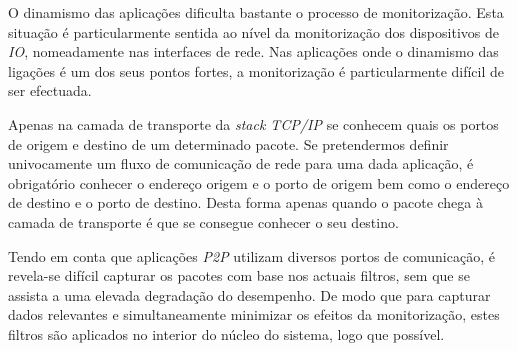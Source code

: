 O dinamismo das aplicações dificulta bastante o processo de monitorização.
Esta situação é particularmente sentida ao nível da monitorização dos dispositivos de \textit{IO}, nomeadamente nas interfaces de rede.
Nas aplicações onde o dinamismo das ligações é um dos seus pontos fortes, a monitorização é particularmente difícil de ser efectuada.

Apenas na camada de transporte da \textit{stack TCP/IP} se conhecem quais os portos de origem e destino de um determinado pacote.
Se pretendermos definir univocamente um fluxo de comunicação de rede para uma dada aplicação, é obrigatório conhecer o endereço origem e o porto de origem bem como o endereço de destino e o porto de destino.
Desta forma apenas quando o pacote chega à camada de transporte é que se consegue conhecer o seu destino.

Tendo em conta que aplicações \textit{P2P} utilizam diversos portos de comunicação, é revela-se difícil capturar os pacotes com base nos actuais filtros, sem que se assista a uma elevada degradação do desempenho.
De modo que para capturar dados relevantes e simultaneamente minimizar os efeitos da monitorização, estes filtros são aplicados no interior do núcleo do sistema, logo que possível.

% 
\bigskip 

